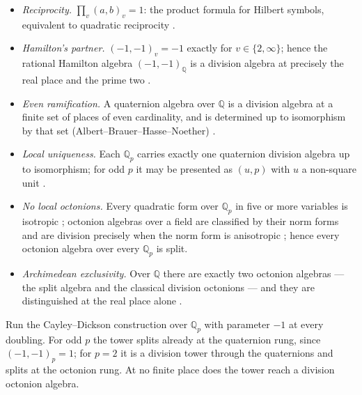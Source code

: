 \begin{theorem}\label{thm:ledger}
\begin{itemize}
\item[\textup{(i)}] \emph{Reciprocity.} $\prod_v (a,b)_v = 1$: the product formula for
Hilbert symbols, equivalent to quadratic reciprocity \autocite{serre1973}.
\item[\textup{(ii)}] \emph{Hamilton's partner.} $(-1,-1)_v = -1$ exactly for
$v \in \{2, \infty\}$; hence the rational Hamilton algebra $(-1,-1)_{\mathbb{Q}}$ is a
division algebra at precisely the real place and the prime two \autocite{serre1973}.
\item[\textup{(iii)}] \emph{Even ramification.} A quaternion algebra over $\mathbb{Q}$
is a division algebra at a finite set of places of even cardinality, and is determined
up to isomorphism by that set (Albert--Brauer--Hasse--Noether)
\autocite{brauerhassenoether1932, alberthasse1932}.
\item[\textup{(iv)}] \emph{Local uniqueness.} Each $\mathbb{Q}_p$ carries exactly one
quaternion division algebra up to isomorphism; for odd $p$ it may be presented as
$(u, p)$ with $u$ a non-square unit \autocite{serre1973}.
\item[\textup{(v)}] \emph{No local octonions.} Every quadratic form over $\mathbb{Q}_p$
in five or more variables is isotropic \autocite{serre1973}; octonion algebras over a
field are classified by their norm forms and are division precisely when the norm form
is anisotropic \autocite{jacobson1958, springerveldkamp2000}; hence every octonion
algebra over every $\mathbb{Q}_p$ is split.
\item[\textup{(vi)}] \emph{Archimedean exclusivity.} Over $\mathbb{Q}$ there are
exactly two octonion algebras --- the split algebra and the classical division
octonions --- and they are distinguished at the real place alone
\autocite{springerveldkamp2000}.
\end{itemize}
\end{theorem}

\begin{corollary}\label{cor:cd-tower}
Run the Cayley--Dickson construction over $\mathbb{Q}_p$ with parameter $-1$ at every
doubling. For odd $p$ the tower splits already at the quaternion rung, since
$(-1,-1)_p = 1$; for $p = 2$ it is a division tower through the quaternions and splits
at the octonion rung. At no finite place does the tower reach a division octonion
algebra.
\end{corollary}

